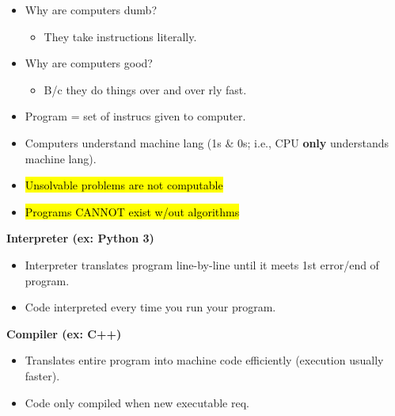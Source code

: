 \documentclass{article}
\begin{document}
    \begin{multicols}{2}
        \begin{itemize}
            \item Why are computers dumb?
                \begin{itemize}
                    \item They take instructions literally.
                \end{itemize}
            \item Why are computers good?
                \begin{itemize}
                    \item B/c they do things over and over rly fast.
                \end{itemize}
            \item Program = set of instrucs given to computer.
            \item Computers understand machine lang (1s \& 0s; i.e., CPU \textbf{only} understands machine lang).
            \item \hl{Unsolvable problems are not computable}
            \item \hl{Programs CANNOT exist w/out algorithms}
        \end{itemize}
    \end{multicols}


    \begin{multicols}{2}
        \textbf{Interpreter (ex: Python 3)}
            \begin{itemize}
                \item Interpreter translates program line-by-line until it meets 1st error/end of program.
                \item Code interpreted every time you run your program.
            \end{itemize}
    
        \textbf{Compiler (ex: C++)}
            \begin{itemize}
                \item Translates entire program into machine code efficiently (execution usually faster).
                \item Code only compiled when new executable req.
            \end{itemize}
    \end{multicols}

\end{document}
